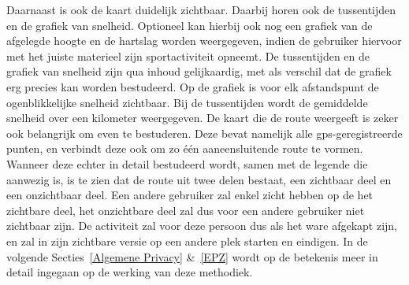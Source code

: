 Daarnaast is ook de kaart duidelijk zichtbaar. Daarbij horen ook de
tussentijden en de grafiek van snelheid. Optioneel kan hierbij ook nog een
grafiek van de afgelegde hoogte en de hartslag worden weergegeven, indien de
gebruiker hiervoor met het juiste materieel zijn sportactiviteit opneemt. De
tussentijden en de grafiek van snelheid zijn qua inhoud gelijkaardig, met als
verschil dat de grafiek erg precies kan worden bestudeerd. Op de grafiek is
voor elk afstandspunt de ogenblikkelijke snelheid zichtbaar. Bij de
tussentijden wordt de gemiddelde snelheid over een kilometer weergegeven. De
kaart die de route weergeeft is zeker ook belangrijk om even te bestuderen.
Deze bevat namelijk alle gps-geregistreerde punten, en verbindt deze ook om zo
één aaneensluitende route te vormen. Wanneer deze echter in detail bestudeerd
wordt, samen met de legende die aanwezig is, is te zien dat de route uit twee
delen bestaat, een zichtbaar deel en een onzichtbaar deel. Een andere gebruiker
zal enkel zicht hebben op de het zichtbare deel, het onzichtbare deel zal dus
voor een andere gebruiker niet zichtbaar zijn. De activiteit zal voor deze
persoon dus als het ware afgekapt zijn, en zal in zijn zichtbare versie op een
andere plek starten en eindigen. In de volgende Secties~\ref{Algemene Privacy}
\&~\ref{EPZ} wordt op de betekenis meer in detail ingegaan op de werking van
deze methodiek.

